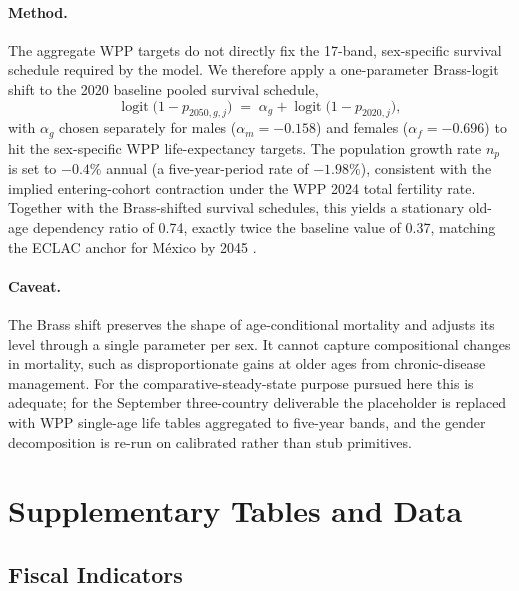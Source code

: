 \documentclass[12pt,a4paper]{article}
\begin{document}
\begin{appendices}
\paragraph{Method.} The aggregate WPP targets do not directly fix the 17-band, sex-specific survival schedule required by the model. We therefore apply a one-parameter Brass-logit shift to the 2020 baseline pooled survival schedule,
\begin{equation}
\label{eq:brass_logit}
\operatorname{logit}\bigl(1 - p_{2050, g, j}\bigr) \;=\; \alpha_g + \operatorname{logit}\bigl(1 - p_{2020, j}\bigr),
\end{equation}
with $\alpha_g$ chosen separately for males ($\alpha_m = -0.158$) and females ($\alpha_f = -0.696$) to hit the sex-specific WPP life-expectancy targets. The population growth rate $n_p$ is set to $-0.4\%$ annual (a five-year-period rate of $-1.98\%$), consistent with the implied entering-cohort contraction under the WPP 2024 total fertility rate. Together with the Brass-shifted survival schedules, this yields a stationary old-age dependency ratio of 0.74, exactly twice the baseline value of 0.37, matching the ECLAC anchor for M\'exico by 2045 \citep{ECLAC2022}.

\paragraph{Caveat.} The Brass shift preserves the shape of age-conditional mortality and adjusts its level through a single parameter per sex. It cannot capture compositional changes in mortality, such as disproportionate gains at older ages from chronic-disease management. For the comparative-steady-state purpose pursued here this is adequate; for the September three-country deliverable the placeholder is replaced with WPP single-age life tables aggregated to five-year bands, and the gender decomposition is re-run on calibrated rather than stub primitives.

\section{Supplementary Tables and Data}
\label{app:supplementary}

\subsection{Fiscal Indicators}
\label{app:fiscal_table}


\end{appendices}
\end{document}
